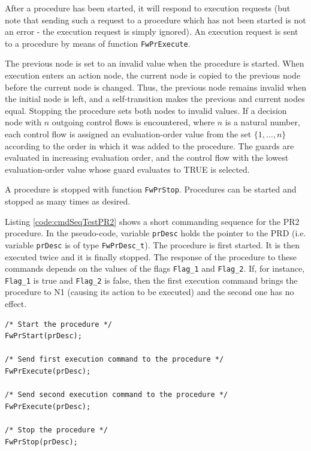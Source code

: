 \documentclass[manual]{../fwprofile}
\begin{document}
After a procedure has been started, it will respond to execution requests (but note that sending 
such a request to a procedure which has not been started is not an error - the execution request is simply ignored). 
An execution request is sent to a procedure by means of function \texttt{FwPrExecute}. 

The previous node is set to an invalid value when the procedure is started. When execution enters an action node,
the current node is copied to the previous node before the current node is changed. Thus, the previous node remains
invalid when the initial node is left, and a self-transition makes the previous and current nodes equal. Stopping
the procedure sets both nodes to invalid values. If a decision node with $n$ outgoing control flows is encountered, where $n$ is a natural number,
each control flow is assigned an evaluation-order value from the set $\{1,\ldots,n\}$ according to the order in which it was added to the procedure.
The guards are evaluated in increasing evaluation order, and the control flow with the lowest evaluation-order value whose guard evaluates to TRUE
is selected.

A procedure is stopped with function \texttt{FwPrStop}. Procedures can be started and stopped as many times 
as desired.

Listing \ref{code:cmdSeqTestPR2} shows a short commanding sequence for the PR2 procedure. In the pseudo-code, variable 
\texttt{prDesc} holds the pointer to the PRD (i.e. variable \texttt{prDesc} is of type \texttt{FwPrDesc\_t}). 
The procedure is first started. 
It is then executed twice and it is finally stopped. 
The response of the procedure to these commands depends on the values of the flags \texttt{Flag\_1} and \texttt{Flag\_2}. 
If, for instance, \texttt{Flag\_1} is true and \texttt{Flag\_2} is false, then the first execution command brings 
the procedure to N1 (causing its action to be executed) and the second one has no effect.


\begin{lstlisting}
/* Start the procedure */
FwPrStart(prDesc);

/* Send first execution command to the procedure */
FwPrExecute(prDesc);

/* Send second execution command to the procedure */
FwPrExecute(prDesc);

/* Stop the procedure */
FwPrStop(prDesc);
\end{lstlisting}
\end{document}
